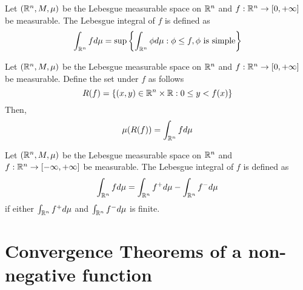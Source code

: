\documentclass{report}
\begin{document}
\begin{definition}
    Let $(\mathbb{R}^n, M, \mu)$ be the Lebesgue measurable space on $\mathbb{R}^n$ and $f: \mathbb{R}^n \to [0, +\infty]$ be measurable. The Lebesgue integral of $f$ is defined as
    \[
        \int_{\mathbb{R}^n} f d\mu = \sup \left\{ \int_{\mathbb{R}^n} \phi d\mu : \phi \leq f, \phi \text{ is simple} \right\}
    \]
\end{definition}

\begin{proposition}
    Let $(\mathbb{R}^n, M, \mu)$ be the Lebesgue measurable space on $\mathbb{R}^n$ and $f: \mathbb{R}^n \to [0, +\infty]$ be measurable. Define the set under $f$ as follows
    \[
        R(f) = \{(x, y) \in \mathbb{R}^n \times \mathbb{R}: 0 \leq y < f(x) \}
    \]
    Then,
    \[
        \mu(R(f)) = \int_{\mathbb{R}^n} f d\mu
    \]
\end{proposition}

\begin{definition}
    Let $(\mathbb{R}^n, M, \mu)$ be the Lebesgue measurable space on $\mathbb{R}^n$ and $f: \mathbb{R}^n \to [-\infty, +\infty]$ be measurable. The Lebesgue integral of $f$ is defined as
    \[
        \int_{\mathbb{R}^n} f d\mu = \int_{\mathbb{R}^n} f^+ d\mu - \int_{\mathbb{R}^n} f^- d\mu
    \]
    if either $\int_{\mathbb{R}^n} f^+ d\mu$ and $\int_{\mathbb{R}^n} f^- d\mu$ is finite.
\end{definition}

\begin{proposition}
    
\end{proposition}

\section{Convergence Theorems of a non-negative function}

\begin{proposition}
    
\end{proposition}

\begin{proposition}
    
\end{proposition}

\begin{theorem}
    
\end{theorem}
\end{document}
